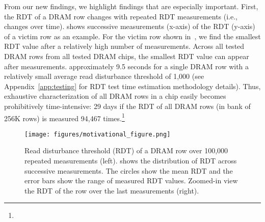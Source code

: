From our  new findings, we  highlight
 findings that are especially important. First, the RDT of
a DRAM row changes with repeated RDT measurements (i.e., changes over time).
 shows  successive measurements
(x-axis) of the RDT (y-axis) of a victim row as an 
example. For the victim row shown in~, we find
the smallest RDT value after a relatively high number of 
measurements. Across all tested DRAM rows from all tested DRAM chips, the
smallest RDT value can appear after  measurements.
 {approximately {9.5} seconds for a single DRAM row
with a relatively small average read disturbance threshold of 1,000 {(see
Appendix~\ref{app:testing} for RDT test time estimation methodology details)}.
Thus, exhaustive \phenomenon{} characterization of all DRAM rows in
 a chip easily becomes prohibitively time-intensive:
 2{9} days if the RDT of all DRAM rows (in  bank of 256K rows) is measured 94,467 times.}\footnote{}


\begin{figure}[!ht]
    \centering
    \texttt{[image: figures/motivational\_figure.png]}
    \caption{Read disturbance threshold (RDT) of a DRAM row over 100,000
    repeated measurements (left). 
    shows the distribution of RDT across  successive measurements.
    The circles show the mean RDT and the error bars show the range of measured
    RDT values. Zoomed-in view  the RDT of the row over the last
     measurements (right).}
    \label{fig:motivation_example}
\end{figure}

